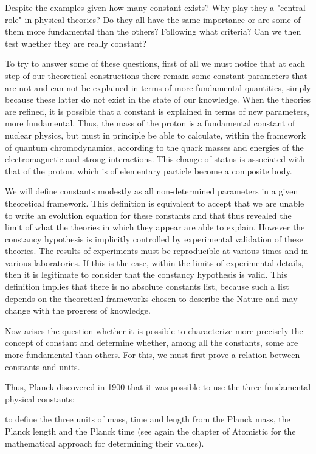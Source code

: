 	
	Despite the examples given how many  constant exists? Why play they a "central role" in physical theories? Do they all have the same importance or are some of them more fundamental than the others? Following what criteria? Can we then test whether they are really constant?
	
	To try to answer some of these questions, first of all we must notice that at each step of our theoretical constructions there remain some constant parameters that are not and can not be explained in terms of more fundamental quantities, simply because these latter do not exist in the state of our knowledge. When the theories are refined, it is possible that a constant is explained in terms of new parameters, more fundamental. Thus, the mass of the proton is a fundamental constant of nuclear physics, but must in principle be able to calculate, within the framework of quantum chromodynamics, according to the quark masses and energies of the electromagnetic and strong interactions. This change of status is associated with that of the proton, which is of elementary particle become a composite body.
	
	We will define constants modestly as all non-determined parameters in a given theoretical framework. This definition is equivalent to accept that we are unable to write an evolution equation for these constants and that thus revealed the limit of what the theories in which they appear are able to explain. However the constancy hypothesis is implicitly controlled by experimental validation of these theories. The results of experiments must be reproducible at various times and in various laboratories. If this is the case, within the limits of experimental details, then it is legitimate to consider that the constancy hypothesis is valid. This definition implies that there is no absolute constants list, because such a list depends on the theoretical frameworks chosen to describe the Nature and may change with the progress of knowledge.
	
	Now arises the question whether it is possible to characterize more precisely the concept of constant and determine whether, among all the constants, some are more fundamental than others. For this, we must first prove a relation between constants and units.

	Thus, Planck discovered in 1900 that it was possible to use the three fundamental physical constants:
	
	to define the three units of mass, time and length from the Planck mass, the Planck length and the Planck time (see again the chapter of Atomistic for the mathematical approach for determining their values).
	
